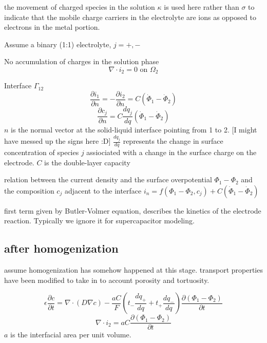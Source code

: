 \documentclass[10pt, oneside]{article}   	%
\begin{document}
the movement of charged species in the solution
$\kappa$ is used here rather than $\sigma$ to indicate that the mobile charge
carriers in the electrolyte are ions as opposed to electrons in the metal
portion.

Assume a binary (1:1) electrolyte, $j=+,-$


No accumulation of charges in the solution phase
\begin{equation}
    \nabla \cdot i_2 = 0 \text{ on } \Omega_2
\end{equation}

Interface $\Gamma_{12}$
\begin{equation}
    \frac{\partial i_1}{\partial n} = 
    -\frac{\partial i_2}{\partial n} = 
        C \left( \dot{\Phi}_1 - \dot{\Phi}_2 \right)
\end{equation}
\begin{equation}
    \frac{\partial c_j}{\partial n} = 
        C \frac{d q_j}{d q} \left( \dot{\Phi}_1 - \dot{\Phi}_2 \right)
\end{equation}
$n$ is the normal vector at the solid-liquid interface pointing from 1 to 2.
[I might have messed up the signs here :D]
$\frac{d q_j}{d q}$ represents the change in surface concentration of species
$j$ assiociated with a change in the surface charge on the electrode.
$C$ is the double-layer capacity

relation between the current density and the surface overpotential
$\Phi_1-\Phi_2$ and the composition $c_j$ adjacent to the interface
$i_n = f(\Phi_1-\Phi_2,c_j) + C \left( \dot{\Phi}_1 - \dot{\Phi}_2 \right)$

first term given by Butler-Volmer equation, describes the kinetics of the
electrode reaction.  Typically we ignore it for supercapacitor modeling.

\subsection{after homogenization}
assume homogenization has somehow happened at this stage.
transport properties have been modified to take in to account porosity and
tortuosity.

\begin{equation}
    \epsilon \frac{\partial c}{\partial t} =
        \nabla \cdot \left( D \nabla c \right)
        - \frac{aC}{F} \left( 
            t_- \frac{d q_+}{d q}
            +
            t_+ \frac{d q_-}{d q}
            \right)
            \frac{\partial \left( \Phi_1 - \Phi_2 \right)}{\partial t}
\end{equation}
\begin{equation}
    \nabla \cdot i_2 =
        aC \frac{\partial \left( \Phi_1 - \Phi_2 \right)}{\partial t}
\end{equation}
$a$ is the interfacial area per unit volume.
\end{document}
